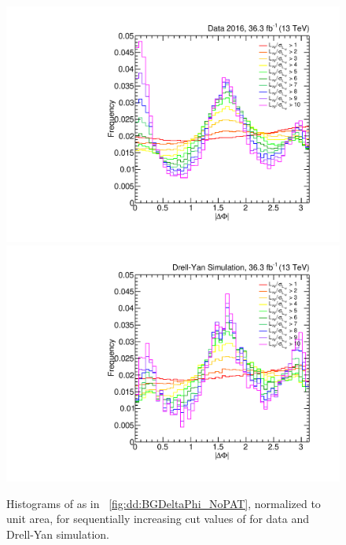 \begin{figure}[htbp]
  \centering
  \includegraphics[width=\DSquareWidth]{figures/displaced/BGEST_EffectOfLxySigCut_Data.pdf}
  \hspace*{-2em}
  \includegraphics[width=\DSquareWidth]{figures/displaced/BGEST_EffectOfLxySigCut_DY.pdf}
  \caption[Histograms of \DeltaPhi for sequentially increasing cut values of \LxySig in data and Drell-Yan simulation.]{Histograms of \DeltaPhi as in \Fig~\ref{fig:dd:BGDeltaPhi_NoPAT}, normalized to unit area, for sequentially increasing cut values of \LxySig for  data and  Drell-Yan simulation.}
  \label{fig:dd:SeqLxySig}
\end{figure}

